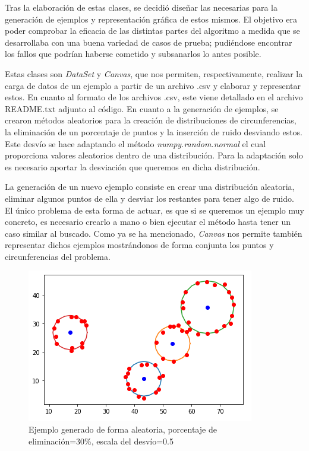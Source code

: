 \documentclass[conference,a4paper]{IEEEtran}
\begin{document}
Tras la elaboración de estas clases, se decidió diseñar las necesarias para la generación de ejemplos y representación gráfica de estos mismos. El objetivo era poder comprobar la eficacia de las distintas partes del algoritmo a medida que se desarrollaba con una buena variedad de casos de prueba; pudiéndose encontrar los fallos que podrían haberse cometido y subsanarlos lo antes posible.

Estas clases son \textit{DataSet} y  \textit{Canvas}, que nos permiten, respectivamente, realizar la carga de datos de un ejemplo a partir de un archivo .csv y elaborar y representar estos. En cuanto al formato de los archivos .csv, este viene detallado en el archivo README.txt adjunto al código. En cuanto a la generación de ejemplos, se crearon métodos aleatorios para la creación de distribuciones de circunferencias, la eliminación de un porcentaje de puntos y la inserción de ruido desviando estos. Este desvío se hace adaptando el método \textit{numpy.random.normal} el cual proporciona valores aleatorios dentro de una distribución. Para la adaptación solo es necesario aportar la desviación que queremos en dicha distribución.

La generación de un nuevo ejemplo consiste en crear una distribución aleatoria, eliminar algunos puntos de ella y desviar los restantes para tener algo de ruido. El único problema de esta forma de actuar, es que si se queremos un ejemplo muy concreto, es necesario crearlo a mano o bien ejecutar el método hasta tener un caso similar al buscado. Como ya se ha mencionado, \textit{Canvas} nos permite también representar dichos ejemplos mostrándonos de forma conjunta los puntos y circunferencias del problema.

\begin{figure}[H]
\centering
\includegraphics[scale=0.8]{EjemploGenerado}
\caption{Ejemplo generado de forma aleatoria, porcentaje de eliminación=30\%, escala del desvío=0.5}
\end{figure}
\end{document}
